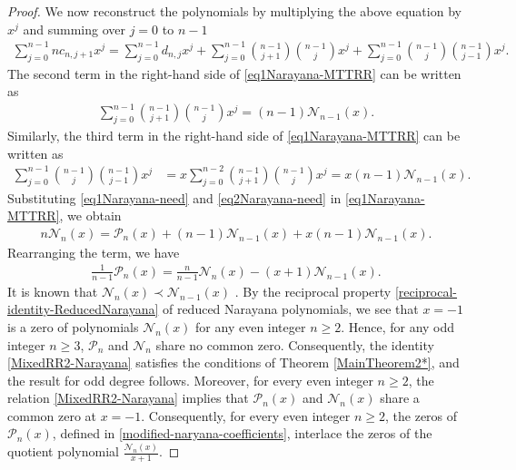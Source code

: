 \documentclass[final,3p,times,12pt]{elsarticle}
\numberwithin{equation}{section}  %
\begin{document}
\begin{proof}
	We now reconstruct the polynomials by multiplying the above equation by $x^{j}$ and summing over $j=0$ to $n-1$
	\begin{align}\label{eq1Narayana-MTTRR}
		\sum_{j=0}^{n-1} n c_{n,j+1} x^{j} = \sum_{j=0}^{n-1} d_{n,j} x^{j} + \sum_{j=0}^{n-1} \binom{n-1}{j+1}\binom{n-1}{j} x^{j} + \sum_{j=0}^{n-1} \binom{n-1}{j}\binom{n-1}{j-1} x^{j}. 
	\end{align}
	The second term in the right-hand  side of  \eqref{eq1Narayana-MTTRR} can be written as 
	\begin{align}\label{eq1Narayana-need}
		\sum_{j=0}^{n-1} \binom{n-1}{j+1}\binom{n-1}{j} x^{j} = (n-1)\mathcal{N}_{n-1}(x).
	\end{align}
	Similarly, the third term in the right-hand side of \eqref{eq1Narayana-MTTRR} can be written as 
	\begin{align}\label{eq2Narayana-need}
		\sum_{j=0}^{n-1} \binom{n-1}{j}\binom{n-1}{j-1} x^{j}  
		&= x \sum_{j=0}^{n-2} \binom{n-1}{j+1}\binom{n-1}{j} x^{j}=x (n-1)\mathcal{N}_{n-1}(x). 
	\end{align}
	Substituting \eqref{eq1Narayana-need} and \eqref{eq2Narayana-need} in \eqref{eq1Narayana-MTTRR}, we obtain 
	\begin{align*}
		n \mathcal{N}_n(x) = \mathcal{P}_n(x) + (n-1)\mathcal{N}_{n-1}(x) + x(n-1)\mathcal{N}_{n-1}(x).
	\end{align*}
	Rearranging the term, we have 	
	\begin{align}\label{MixedRR2-Narayana}
		\frac{1}{n-1} \mathcal{P}_n(x) = \frac{n}{n-1} \mathcal{N}_n(x) - (x+1)\mathcal{N}_{n-1}(x).
	\end{align}
	It is known that $\mathcal{N}_n(x)\prec \mathcal{N}_{n-1}(x)$ \cite[Corollary 7]{Kostov-Finkelshtein-Shapiro-NarayanaNumbers-JAT-2009}. By the reciprocal property  \eqref{reciprocal-identity-ReducedNarayana} of reduced Narayana polynomials,  we see that $x=-1$ is a zero of polynomials $\mathcal{N}_n(x)$ for any even integer $n\geq2$.  Hence, for any odd integer $n\geq3$, $\mathcal{P}_n$ and $\mathcal{N}_n$ share no common zero. Consequently, the identity \eqref{MixedRR2-Narayana} satisfies the conditions of Theorem \ref{MainTheorem2*}, and the result for odd degree follows. Moreover, for every even integer $n \geq 2$, the relation \eqref{MixedRR2-Narayana} implies that $\mathcal{P}_n(x)$ and $\mathcal{N}_n(x)$ share a common zero at $x=-1$. Consequently, for every even integer $n \geq 2$, the zeros of $\mathcal{P}_n(x)$, defined in \eqref{modified-naryana-coefficients}, interlace the zeros of the quotient polynomial $\frac{\mathcal{N}_n(x)}{x+1}$.
\end{proof}
\end{document}
